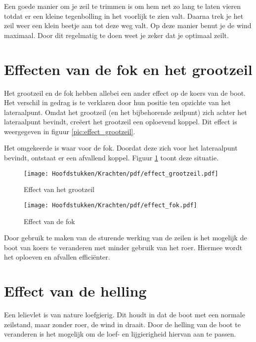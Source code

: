 Een goede manier om je zeil te trimmen is om hem net zo lang te laten vieren totdat er een kleine tegenbolling in het voorlijk te zien valt. Daarna trek je het zeil weer een klein beetje aan tot deze weg valt. Op deze manier benut je de wind maximaal. Door dit regelmatig te doen weet je zeker dat je optimaal zeilt. 

\section{Effecten van de fok en het grootzeil}
Het grootzeil en de fok hebben allebei een ander effect op de koers van de boot. Het verschil in gedrag is te verklaren door hun positie ten opzichte van het lateraalpunt. Omdat het grootzeil (en het bijbehorende zeilpunt) zich achter het lateraalpunt bevindt, creëert het grootzeil een oploevend koppel. Dit effect is weergegeven in figuur \ref{pic:effect_grootzeil}.

Het omgekeerde is waar voor de fok. Doordat deze zich voor het lateraalpunt bevindt, ontstaat er een afvallend koppel. Figuur \ref{pic:effect_fok} toont deze situatie. 

\begin{figure}[ht]
	\centering
	\begin{minipage}[b]{0.49\textwidth}
		\centering
		\texttt{[image: Hoofdstukken/Krachten/pdf/effect\_grootzeil.pdf]}
		\caption{Effect van het grootzeil}
		\label{pic:effect_grootzeil}
	\end{minipage}
	\hfill
	\begin{minipage}[b]{0.49\textwidth}
		\centering
		\texttt{[image: Hoofdstukken/Krachten/pdf/effect\_fok.pdf]}
		\caption{Effect van de fok}
		\label{pic:effect_fok}
	\end{minipage}
\end{figure}

Door gebruik te maken van de sturende werking van de zeilen is het mogelijk de boot van koers te veranderen met minder gebruik van het roer. Hiermee wordt het oploeven en afvallen efficiënter.

\section{Effect van de helling}
Een lelievlet is van nature loefgierig. Dit houdt in dat de boot met een normale zeilstand, maar zonder roer, de wind in draait. Door de helling van de boot te veranderen is het mogelijk om de loef- en lijgierigheid hiervan aan te passen.

